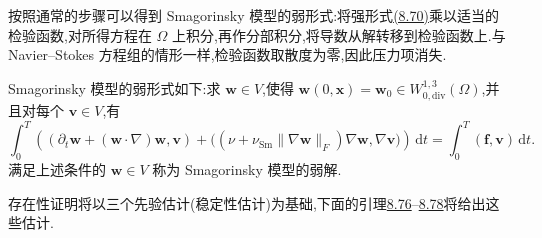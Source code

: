 \begin{note}[弱形式]
\label{note:smagorinsky-weak-form}
按照通常的步骤可以得到 Smagorinsky 模型的弱形式:将强形式\hyperref[eq:smagorinsky-strong-form]{(8.70)}乘以适当的检验函数,对所得方程在 $\Omega$ 上积分,再作分部积分,将导数从解转移到检验函数上.与 Navier--Stokes 方程组的情形一样,检验函数取散度为零,因此压力项消失.

Smagorinsky 模型的弱形式如下:求 $\bm{w}\in V$,使得 $\bm{w}(0,\bm{x})=\bm{w}_0\in W_{0,\mathrm{div}}^{1,3}(\Omega)$,并且对每个 $\bm{v}\in V$,有
\begin{equation}\label{eq:smagorinsky-weak-form}
\int_0^T
 \left(
  (\partial_t\bm{w}+(\bm{w}\cdot\nabla)\bm{w},\bm{v})
  +\bigl(
    (\nu+\nu_{\mathrm{Sm}}\|\nabla\bm{w}\|_F)
       \nabla\bm{w},\nabla\bm{v}
   \bigr)
 \right)\,\mathrm{d}t
 =\int_0^T(\bm{f},\bm{v})\,\mathrm{d}t.
\end{equation}
满足上述条件的 $\bm{w}\in V$ 称为 Smagorinsky 模型的弱解.
\end{note}

\begin{note}[收敛性证明的准备]
\label{note:smagorinsky-convergence-preparations}
存在性证明将以三个先验估计(稳定性估计)为基础,下面的引理\hyperref[lem:smagorinsky-l2-stability]{8.76}--\hyperref[lem:smagorinsky-h1-stability]{8.78}将给出这些估计.
\end{note}

